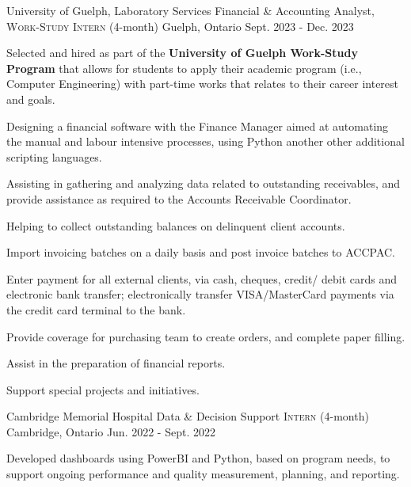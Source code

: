 \begin{cventries}
  \cventry
    {University of Guelph, Laboratory Services} %
    {Financial \& Accounting Analyst,  \textsc{Work-Study Intern} (4-month)} %
    {Guelph, Ontario } %
    {Sept. 2023 - Dec. 2023} %
    {
      \begin{cvitems} %
        \item Selected and hired as part of the\textbf{ University of Guelph Work-Study Program} that allows for students to apply their academic program (i.e., Computer Engineering) with part-time works that relates to their career interest and goals.
        \item Designing a financial software with the Finance Manager aimed at automating the manual and labour intensive processes, using Python another other additional scripting languages.
        \item Assisting in gathering and analyzing data related to outstanding receivables, and provide assistance as required to the Accounts Receivable Coordinator.
        \item Helping to collect outstanding balances on delinquent client accounts.
        \item Import invoicing batches on a daily basis and post invoice batches to ACCPAC.
        \item Enter payment for all external clients, via cash, cheques, credit/ debit cards and electronic bank transfer; electronically transfer VISA/MasterCard payments via the credit card terminal to the bank.
        \item Provide coverage for purchasing team to create orders, and complete paper filling.
        \item Assist in the preparation of financial reports.
        \item Support special projects and initiatives.
      \end{cvitems}
    }
  \cventry
    {Cambridge Memorial Hospital} %
    {Data \& Decision Support \textsc{Intern} (4-month)} %
    {Cambridge, Ontario } %
    {Jun. 2022 - Sept. 2022} %
    {
      \begin{cvitems} %
        \item Developed dashboards using PowerBI and Python, based on program needs, to support ongoing performance and quality measurement, planning, and reporting.

\end{cvitems}}
\end{cventries}
